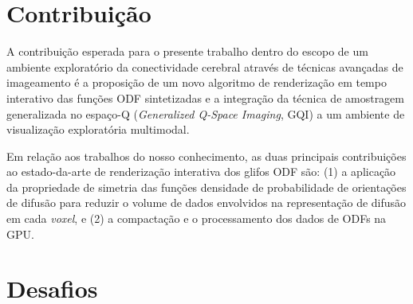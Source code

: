 \documentclass[
    12pt,                %
    oneside,            %
    a4paper,            %
    english,            %
    french,                %
    spanish,            %
    brazil                %
    ]{abntex2}
\begin{document}
\section{Contribuição}
\label{sec:contribuicoes}

A contribuição esperada para o presente trabalho dentro do escopo de um ambiente exploratório da conectividade cerebral através de técnicas avançadas de imageamento é a proposição de um novo algoritmo de renderização em tempo interativo das funções ODF sintetizadas e a integração da técnica de amostragem generalizada no espaço-Q (\textit{Generalized Q-Space Imaging}, GQI) \cite{yeh2010}  a um ambiente de visualização exploratória multimodal.

Em relação aos trabalhos do nosso conhecimento, as duas principais contribuições ao estado-da-arte de renderização interativa dos glifos ODF são: (1) a aplicação da propriedade de simetria das funções densidade de probabilidade de orientações de difusão para reduzir o volume de dados envolvidos na representação de difusão em cada \textit{voxel}, e (2) a compactação e o processamento dos dados de ODFs na GPU.







\section{Desafios}
\label{sec::desafios}
\end{document}
